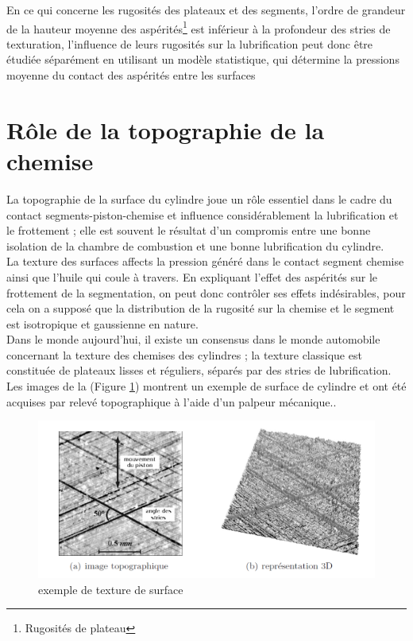 En ce qui concerne les rugosités des plateaux et des segments, l’ordre de grandeur de la hauteur moyenne des aspérités\footnote{Rugosités de plateau} est inférieur à la profondeur des stries de texturation, l’influence de leurs rugosités sur la lubrification peut donc être étudiée séparément en utilisant un modèle statistique, qui détermine la pressions moyenne du contact des aspérités entre les surfaces


\section{Rôle de la topographie de la chemise}
La topographie de la surface du cylindre joue un rôle essentiel dans le cadre du contact
segments-piston-chemise et influence considérablement la lubrification et le frottement ;
elle est souvent le résultat d’un compromis entre une bonne isolation de la chambre de
combustion et une bonne lubrification du cylindre.\\

La texture des surfaces affects la pression généré dans le contact segment chemise ainsi que
l'huile qui coule à travers. En expliquant l'effet des aspérités sur le frottement de la segmentation, on peut donc contrôler ses effets indésirables, pour cela on a supposé que la distribution de la rugosité sur la chemise et le segment est isotropique et gaussienne en nature.\\

Dans le monde aujourd'hui, il existe un consensus dans le monde automobile concernant la texture des chemises des cylindres ; la texture classique est constituée de plateaux lisses et réguliers,
séparés par des stries de lubrification. Les images de la (Figure \ref{fig:image-topographique}) montrent un exemple de surface de cylindre et ont été acquises par relevé topographique à l’aide d’un palpeur mécanique.\cite{costin}.

\begin{figure}[h]
	\centering
	\includegraphics[width=0.7\linewidth]{"Img/image topographique"}
	\caption[exemple de texture de surface]{exemple de texture de surface}
	\label{fig:image-topographique}
\end{figure}

